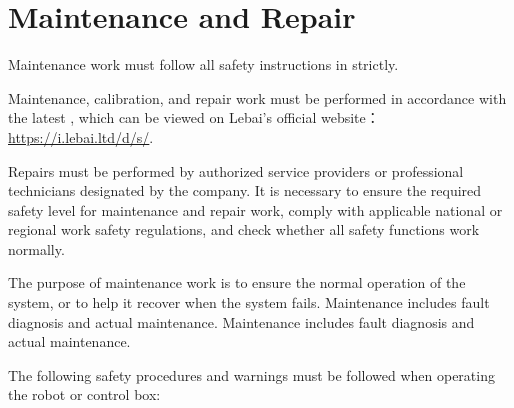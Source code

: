 \chapter{Maintenance and Repair}

Maintenance work must follow all safety instructions in {\ThisBook} strictly.

Maintenance, calibration, and repair work must be performed in accordance with the latest {\ThatBook}, which can be viewed on Lebai's official website：\url{https://i.lebai.ltd/d/s/}.



Repairs must be performed by authorized service providers or professional technicians designated by the company. It is necessary to ensure the required safety level for maintenance and repair work, comply with applicable national or regional work safety regulations, and check whether all safety functions work normally.

The purpose of maintenance work is to ensure the normal operation of the system, or to help it recover when the system fails. Maintenance includes fault diagnosis and actual maintenance. Maintenance includes fault diagnosis and actual maintenance.


The following safety procedures and warnings must be followed when operating the robot or control box:

